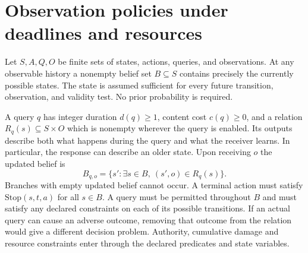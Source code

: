 \section{Observation policies under deadlines and resources}\label{sec:policies}
Let $S,A,Q,O$ be finite sets of states, actions, queries, and observations. At any observable history a nonempty belief set $B\subseteq S$ contains precisely the currently possible states. The state is assumed sufficient for every future transition, observation, and validity test. No prior probability is required.

A query $q$ has integer duration $d(q)\ge1$, content cost $c(q)\ge0$, and a relation $R_q(s)\subseteq S\times O$ which is nonempty wherever the query is enabled. Its outputs describe both what happens during the query and what the receiver learns. In particular, the response can describe an older state. Upon receiving $o$ the updated belief is
\begin{equation}\label{eq:belief}
B_{q,o}=\{s':\exists s\in B,\ (s',o)\in R_q(s)\}.
\end{equation}
Branches with empty updated belief cannot occur. A terminal action must satisfy $\mathrm{Stop}(s,t,a)$ for all $s\in B$. A query must be permitted throughout $B$ and must satisfy any declared constraints on each of its possible transitions. If an actual query can cause an adverse outcome, removing that outcome from the relation would give a different decision problem. Authority, cumulative damage and resource constraints enter through the declared predicates and state variables.

